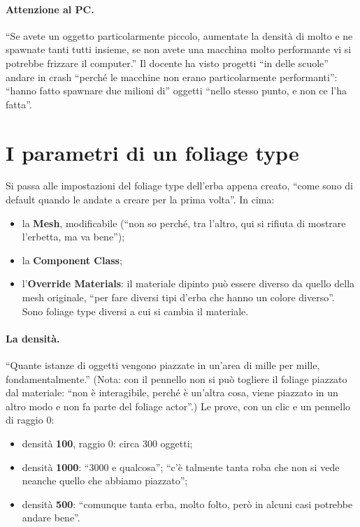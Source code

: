 \paragraph{Attenzione al PC.} ``Se avete un oggetto particolarmente piccolo, aumentate la
densità di molto e ne spawnate tanti tutti insieme, se non avete una macchina molto
performante vi si potrebbe frizzare il computer.'' Il docente ha visto progetti ``in delle
scuole'' andare in crash ``perché le macchine non erano particolarmente performanti'': ``hanno
fatto spawnare due milioni di'' oggetti ``nello stesso punto, e non ce l'ha fatta''.

\section{I parametri di un foliage type}
\label{ue15:sec:parametri}

Si passa alle impostazioni del foliage type dell'erba appena creato, ``come sono di default
quando le andate a creare per la prima volta''. In cima:
\begin{itemize}
  \item la \textbf{Mesh}, modificabile (``non so perché, tra l'altro, qui si rifiuta di
        mostrare l'erbetta, ma va bene'');
  \item la \textbf{Component Class};
  \item l'\textbf{Override Materials}: il materiale dipinto può essere diverso da quello
        della mesh originale, ``per fare diversi tipi d'erba che hanno un colore diverso''.
        Sono foliage type diversi a cui si cambia il materiale.
\end{itemize}

\paragraph{La densità.} ``Quante istanze di oggetti vengono piazzate in un'area di mille per
mille, fondamentalmente.'' (Nota: con il pennello non si può togliere il foliage piazzato dal
materiale: ``non è interagibile, perché è un'altra cosa, viene piazzato in un altro modo e non
fa parte del foliage actor''.) Le prove, con un clic e un pennello di raggio 0:
\begin{itemize}
  \item densità \textbf{100}, raggio 0: circa 300 oggetti;
  \item densità \textbf{1000}: ``3000 e qualcosa''; ``c'è talmente tanta roba che non si vede
        neanche quello che abbiamo piazzato'';
  \item densità \textbf{500}: ``comunque tanta erba, molto folto, però in alcuni casi
        potrebbe andare bene''.
\end{itemize}

